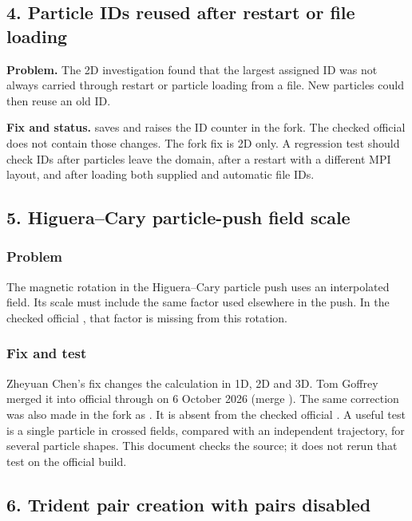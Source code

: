 \subsection*{4. Particle IDs reused after restart or file loading}
\label{bug:4}
\textbf{Problem.} The 2D investigation found that the largest
assigned ID was not always carried through restart or particle
loading from a file. New particles could then reuse an old ID.

\textbf{Fix and status.}  saves and raises
the ID counter in the fork. The checked official 
does not contain those changes. The fork fix is 2D only.
A regression test should check IDs after particles leave the
domain, after a restart with a different MPI layout, and after
loading both supplied and automatic file IDs.

\subsection*{5. Higuera--Cary particle-push field scale}
\label{bug:5}
\subsubsection*{Problem}
The magnetic rotation in the Higuera--Cary particle push uses
an interpolated field. Its scale must include the same factor
used elsewhere in the push. In the checked official ,
that factor is missing from this rotation.

\subsubsection*{Fix and test}
Zheyuan Chen's fix  changes the calculation in
1D, 2D and 3D. Tom Goffrey merged it into official
 through  on 6 October 2026
(merge ). The same correction was also made in
the fork as . It is absent from the checked
official . A useful test is a
single particle in crossed fields, compared with an independent
trajectory, for several particle shapes. This document checks
the source; it does not rerun that test on the official build.

\subsection*{6. Trident pair creation with pairs disabled}
\label{bug:6}
